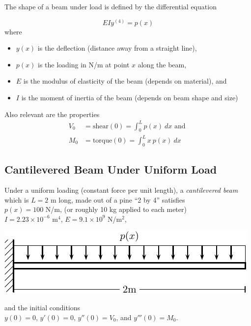 \newpage

The shape of a beam under load is defined by the differential equation

$$EI y^{(4)} = p(x)$$
where 
\begin{itemize}
\item $y(x)$ is the deflection (distance away from a straight line),  
\item $p(x)$ is the loading in N/m at point $x$ along the beam, 
\item $E$ is the modulus of elasticity of the beam (depends on material), and  
\item $I$ is the moment of inertia of the beam (depends on beam shape and size) 
\end{itemize}

Also relevant are the properties 
\begin{align*}
  V_0 & = \mbox{shear}(0) = \int_0^L p(x)~dx \mbox{ and }\\
  M_0 & = \mbox{torque}(0) = \int_0^L x ~p(x)~dx 
\end{align*}

 \newpage


\subsection*{Cantilevered Beam Under Uniform Load} 

 Under a uniform loading (constant force per unit length), a {\em
   cantilevered beam} which is $L = 2$ m long, made out of a pine ``2 by 4'' satisfies \\
 $p(x) = 100$ N/m, (or roughly 10 kg applied to each meter) \\
 $I = 2.23 \times 10^{-6}$ m$^4$,\hspace{0.5in} $E = 9.1 \times
 10^{9}$ N/m$^2$,

 \begin{center}
\includegraphics[width=0.6\linewidth]{graphics/notes_09_beams1}
 \end{center}

and the initial conditions \\
$y(0) = 0$, $y'(0) = 0$, $y''(0) = V_0$, and $y'''(0) = M_0$.

